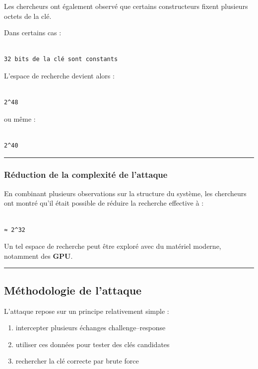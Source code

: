 \documentclass[
  french,
]{article}
\providecommand{\tightlist}{%
  \setlength{\itemsep}{0pt}\setlength{\parskip}{0pt}}
\begin{document}
Les chercheurs ont également observé que certains constructeurs fixent
plusieurs octets de la clé.

Dans certains cas :

\begin{verbatim}

32 bits de la clé sont constants
\end{verbatim}

L'espace de recherche devient alors :

\begin{verbatim}

2^48
\end{verbatim}

ou même :

\begin{verbatim}

2^40
\end{verbatim}

\begin{center}\rule{0.5\linewidth}{0.5pt}\end{center}

\subsubsection{Réduction de la complexité de
l'attaque}\label{ruxe9duction-de-la-complexituxe9-de-lattaque}

En combinant plusieurs observations sur la structure du système, les
chercheurs ont montré qu'il était possible de réduire la recherche
effective à :

\begin{verbatim}

≈ 2^32
\end{verbatim}

Un tel espace de recherche peut être exploré avec du matériel moderne,
notamment des \textbf{GPU}.

\begin{center}\rule{0.5\linewidth}{0.5pt}\end{center}

\subsection{Méthodologie de
l'attaque}\label{muxe9thodologie-de-lattaque}

L'attaque repose sur un principe relativement simple :

\begin{enumerate}
\def\labelenumi{\arabic{enumi}.}
\tightlist
\item
  intercepter plusieurs échanges challenge--response
\item
  utiliser ces données pour tester des clés candidates
\item
  rechercher la clé correcte par brute force
\end{enumerate}
\end{document}
